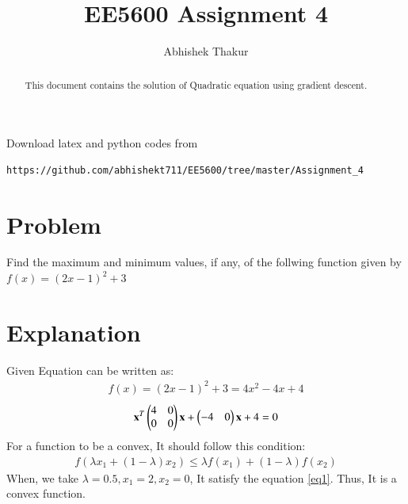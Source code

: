 \documentclass[journal,12pt,twocolumn]{IEEEtran}
\begin{document}
     \def\rightbox#1{\makebox[0in][r]{#1}}
     \def\centbox#1{\makebox[0in]{#1}}
     \def\topbox#1{\raisebox{-\baselineskip}[0in][0in]{#1}}
     \def\midbox#1{\raisebox{-0.5\baselineskip}[0in][0in]{#1}}
\vspace{3cm}
\title{EE5600 Assignment 4}
\author{Abhishek Thakur}
\maketitle
\newpage
\bigskip
\renewcommand{\thefigure}{\theenumi}
\renewcommand{\thetable}{\theenumi}
\newcommand\hlight[1]{\tikz[overlay, remember picture,baseline=-\the\dimexpr\fontdimen22\textfont2\relax]\node[rectangle,fill=blue!50,rounded corners,fill opacity = 0.2,draw,thick,text opacity =1] {$#1$};}
\begin{abstract}
This document contains the solution of Quadratic equation using gradient descent.
\end{abstract}
Download latex and python codes from 
\begin{lstlisting}
https://github.com/abhishekt711/EE5600/tree/master/Assignment_4
\end{lstlisting}
%
\section{Problem}
Find the maximum and minimum values, if any, of the follwing function given by\\
    $f(x)=(2x-1)^2+3$
\section{Explanation}
Given Equation can be written as:
\begin{align}
    f(x)=(2x-1)^2+3=4x^2-4x+4
\end{align}
\begin{align}
	\mathbf{x}^T\begin{pmatrix}4&0\\0&0\end{pmatrix}\mathbf{x}  + \begin{pmatrix}-4&0\end{pmatrix}\mathbf{x} +4 = 0
\end{align}
For a function to be a convex, It should follow this condition:
    \begin{align}
        f(\lambda x_1+(1-\lambda) x_2) \leq \lambda f(x_1)+(1-\lambda) f(x_2) \label{eq1}
    \end{align}
    When, we take $\lambda=0.5, x_1=2, x_2=0$, It satisfy the equation \ref{eq1}.
    Thus, It is a convex function.\\
    
    
    
\end{document}
